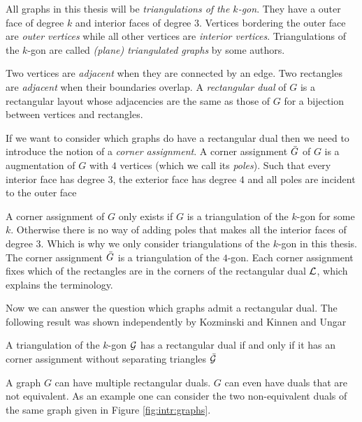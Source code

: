   All graphs in this thesis will be \emph{triangulations of the $k$-gon}. They have a outer face of degree $k$ and interior faces of degree $3$.
  Vertices bordering the outer face are \emph{outer vertices} while all other vertices are \emph{interior vertices}. 
  Triangulations of the $k$-gon are called \emph{(plane) triangulated graphs} by some authors.

  Two vertices are \emph{adjacent} when they are connected by an edge. Two rectangles are \emph{adjacent} when their boundaries overlap. A \emph{rectangular dual} of $G$ is a rectangular layout whose adjacencies are the same as those of $G$ for a bijection between vertices and rectangles.

  If we want to consider which graphs do have a rectangular dual then we need to introduce the notion of a \emph{corner assignment}.
  A corner assignment $\bar{G}$ of $G$ is a augmentation of $G$ with $4$ vertices (which we call its \emph{poles}). Such that every interior face has degree $3$, the exterior face has degree $4$ and all poles are incident to the outer face

  A corner assignment of $G$ only exists if $G$ is a triangulation of the $k$-gon for some $k$. Otherwise there is no way of adding poles that makes all the interior faces of degree $3$. Which is why we only consider triangulations of the $k$-gon in this thesis. The corner assignment $\bar{G}$ is a triangulation of the $4$-gon. Each corner assignment fixes which of the rectangles are in the corners of the rectangular dual $\mathcal{L}$, which explains the terminology.


  Now we can answer the question which graphs admit a rectangular dual. The following result was shown independently by Kozminski and Kinnen \cite{Kozminski1984} and Ungar \cite{Ungar1953}

  \begin{thrm}
    \label{th:rect:exsitenceREctangularDual}
    A triangulation of the $k$-gon $\mathcal{G}$ has a rectangular dual if and only if it has an corner assignment without separating triangles $\bar{\mathcal{G}}$
  \end{thrm}

  A graph $G$ can have multiple rectangular duals. $G$ can even have duals that are not equivalent. As an example one can consider the two non-equivalent duals of the same graph given in Figure \ref{fig:intr:graphs}.

